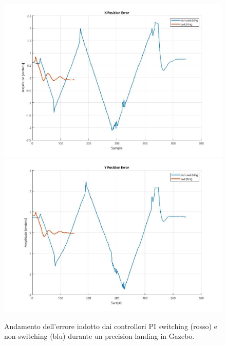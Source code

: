 \begin{figure}
    \centering
    \includegraphics[scale=0.4]{figs/chapter4/xgaz.jpg}
    \includegraphics[scale=0.4]{figs/chapter4/ygaz.jpg}
    \caption{Andamento dell'errore indotto dai controllori PI switching (rosso) e non-switching (blu) durante un precision landing in Gazebo.}
    \label{fig:gazcomp}
\end{figure}
